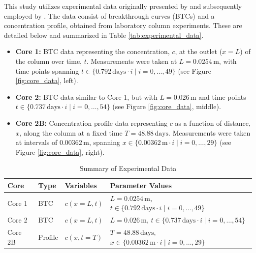 This study utilizes experimental data originally presented by \cite{nowak2016entropy} and subsequently employed by \cite{finn}. The data consist of breakthrough curves (BTCs) and a concentration profile, obtained from laboratory column experiments. These are detailed below and summarized in Table \vref{tab:experimental_data}.

\begin{itemize}
    \item \textbf{Core 1:} BTC data representing the concentration, $c$, at the outlet ($x = L$) of the column over time, $t$. Measurements were taken at $L = 0.0254\,\text{m}$, with time points spanning $t \in \{0.792\,\text{days} \cdot i \mid i = 0, \dots, 49\}$ (see Figure \vref{fig:core_data}, left).
    \item \textbf{Core 2:} BTC data similar to Core 1, but with $L = 0.026\,\text{m}$ and time points $t \in \{0.737\,\text{days} \cdot i \mid i = 0, \dots, 54\}$ (see Figure \vref{fig:core_data}, middle).
    \item \textbf{Core 2B:} Concentration profile data representing $c$ as a function of distance, $x$, along the column at a fixed time $T = 48.88\,\text{days}$. Measurements were taken at intervals of $0.00362\,\text{m}$, spanning $x \in \{0.00362\,\text{m} \cdot i \mid i = 0, \dots, 29\}$ (see Figure \vref{fig:core_data}, right).
\end{itemize}

\begin{table}[h!]
    \centering
    \caption{Summary of Experimental Data}
    \label{tab:experimental_data}
    \begin{tabular}{llll}
        \toprule
        Core   & Type       & Variables                 & Parameter Values                                      \\
        \midrule
        Core 1 & BTC        & $c(x=L, t)$              & $L = 0.0254\,\text{m}$, $t \in \{0.792\,\text{days} \cdot i \mid i = 0, \dots, 49\}$ \\
        Core 2 & BTC        & $c(x=L, t)$              & $L = 0.026\,\text{m}$, $t \in \{0.737\,\text{days} \cdot i \mid i = 0, \dots, 54\}$  \\
        Core 2B & Profile    & $c(x, t=T)$              & $T = 48.88\,\text{days}$, $x \in \{0.00362\,\text{m} \cdot i \mid i = 0, \dots, 29\}$ \\
        \bottomrule
    \end{tabular}
\end{table}

